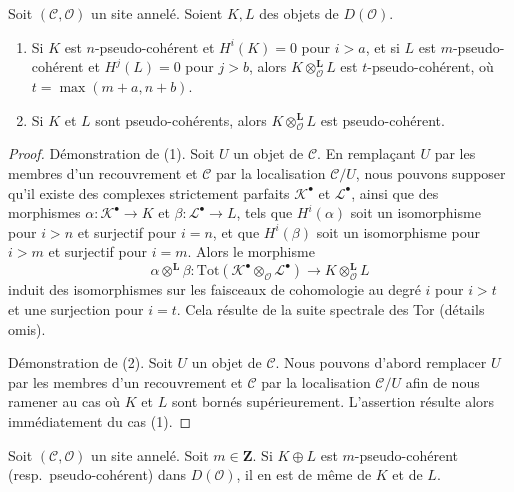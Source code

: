 \begin{lemma}
\label{lemma-tensor-pseudo-coherent}
Soit $(\mathcal{C}, \mathcal{O})$ un site annelé. Soient $K, L$ des objets
de $D(\mathcal{O})$.
\begin{enumerate}
\item Si $K$ est $n$-pseudo-cohérent et $H^i(K) = 0$ pour $i > a$, et si
$L$ est $m$-pseudo-cohérent et $H^j(L) = 0$ pour $j > b$, alors
$K \otimes_\mathcal{O}^\mathbf{L} L$ est $t$-pseudo-cohérent, où
$t = \max(m + a, n + b)$.
\item Si $K$ et $L$ sont pseudo-cohérents, alors
$K \otimes_\mathcal{O}^\mathbf{L} L$ est pseudo-cohérent.
\end{enumerate}
\end{lemma}

\begin{proof}
Démonstration de (1). Soit $U$ un objet de $\mathcal{C}$. En remplaçant $U$
par les membres d'un recouvrement et $\mathcal{C}$ par la localisation
$\mathcal{C}/U$, nous pouvons supposer qu'il existe des complexes strictement
parfaits $\mathcal{K}^\bullet$ et $\mathcal{L}^\bullet$, ainsi que des
morphismes $\alpha : \mathcal{K}^\bullet \to K$ et
$\beta : \mathcal{L}^\bullet \to L$, tels que $H^i(\alpha)$ soit un
isomorphisme pour $i > n$ et surjectif pour $i = n$, et que $H^i(\beta)$ soit
un isomorphisme pour $i > m$ et surjectif pour $i = m$. Alors le morphisme
$$
\alpha \otimes^\mathbf{L} \beta :
\text{Tot}(\mathcal{K}^\bullet \otimes_\mathcal{O} \mathcal{L}^\bullet)
\to K \otimes_\mathcal{O}^\mathbf{L} L
$$
induit des isomorphismes sur les faisceaux de cohomologie au degré $i$ pour
$i > t$ et une surjection pour $i = t$. Cela résulte de la suite spectrale
des Tor (détails omis).

\medskip\noindent
Démonstration de (2). Soit $U$ un objet de $\mathcal{C}$. Nous pouvons d'abord
remplacer $U$ par les membres d'un recouvrement et $\mathcal{C}$ par la
localisation $\mathcal{C}/U$ afin de nous ramener au cas où $K$ et $L$ sont
bornés supérieurement. L'assertion résulte alors immédiatement du cas (1).
\end{proof}

\begin{lemma}
\label{lemma-summands-pseudo-coherent}
Soit $(\mathcal{C}, \mathcal{O})$ un site annelé. Soit $m \in \mathbf{Z}$.
Si $K \oplus L$ est $m$-pseudo-cohérent (resp.\ pseudo-cohérent) dans
$D(\mathcal{O})$, il en est de même de $K$ et de $L$.
\end{lemma}

